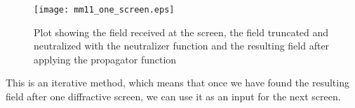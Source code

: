 \begin{figure}[!h]
  \centering
  \texttt{[image: mm11\_one\_screen.eps]}
  \caption{Plot showing the field received at the screen, the field truncated and neutralized with the neutralizer function and the resulting field after applying the propagator function}
  \label{fig:mm11_one_screen}
\end{figure}

This is an iterative method, which means that once we have found the resulting field after one diffractive screen, we can use it as an input for the next screen.